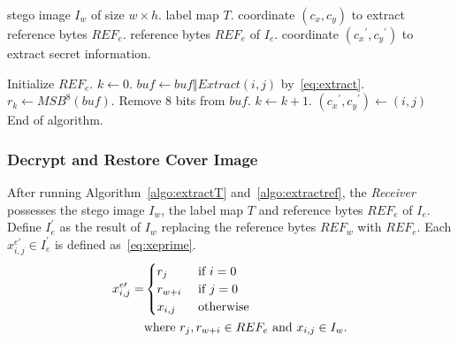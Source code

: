 \begin{algorithm}
	\caption{Extract reference bytes.}
	\label{algo:extractref}
	
	\begin{algorithmic}[1]
		\Require stego image $I_w$ of size $w \times h$.
		\Require label map $T$.
		\Require coordinate $(c_x, c_y)$ to extract reference bytes $REF_e$.
		\Ensure reference bytes $REF_e$ of $I_e$.
		\Ensure coordinate $({c_x}^\prime, {c_y}^\prime)$ to extract secret information.
		
		\State Initialize $REF_e$.
		\State $k \gets 0$.
		\ForAll{$\{ (i, j) \mid (i = c_x \wedge j \in (c_y, w)) \vee (i \in (c_x, h), j \in [1, w))\}$}
		\State 		$buf \gets buf \Vert Extract(i, j)$ by~\eqref{eq:extract}.
		\State 			$r_k \gets MSB^8(buf)$. 
		\State 			Remove 8 bits from $buf$.
		\State 			$k \gets k + 1$.
		\State				$({c_x}^\prime, {c_y}^\prime) \gets (i, j)$
		\State 				End of algorithm.
		\EndIf
		\EndIf
		\EndFor
	\end{algorithmic}
\end{algorithm}







\subsubsection{Decrypt and Restore Cover Image}
\label{sec:restore}

After running Algorithm~\ref{algo:extractT} and~\ref{algo:extractref}, the \emph{Receiver} possesses the stego image $I_w$, the label map $T$ and reference bytes $REF_e$ of $I_e$.
Define $I_e^\prime$ as the result of $I_w$ replacing the reference bytes $REF_w$ with $REF_e$.
Each $x_{i, j}^{e\prime} \in I_e^\prime$ is defined as~\eqref{eq:xeprime}.
\begin{align}
	\label{eq:xeprime}
	x_{i, j}^{e\prime} = &
	\begin{cases}
		r_{j}     & \text{ if } i = 0 \\
		r_{w + i}  & \text{ if } j = 0\\
		x_{i, j}     & \text{ otherwise }
	\end{cases} \\
	&\text{where } r_{j}, r_{w + i} \in REF_e \text{ and }  x_{i, j} \in I_w. \notag
\end{align}

